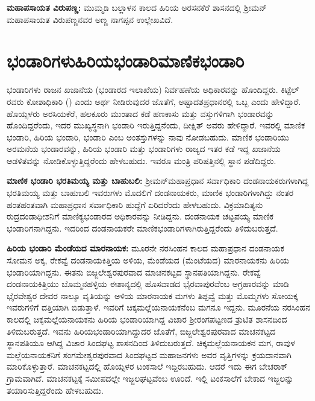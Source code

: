 \textbf{ಮಹಾಪಸಾಯತ ವಿರುಪಣ್ಣ:} ಮುಮ್ಮಡಿ ಬಲ್ಲಾಳನ ಕಾಲದ ಹಿರಿಯ ಅರಸನಕೆರೆ ಶಾಸನದಲ್ಲಿ ಶ‍್ರೀಮನ್​ ಮಹಾಪಸಾಯತ ವಿರುಪಣ್ಣನವರ ಅಣ್ಣ ನಾಗಪ್ಪನ ಉಲ್ಲೇಖವಿದೆ.


\section{ಭಂಡಾರಿಗಳು\enginline{-}ಹಿರಿಯಭಂಡಾರಿ\enginline{-}ಮಾಣಿಕಭಂಡಾರಿ}

ಭಂಡಾರಿಗಳು ರಾಜನ ಖಜಾನೆಯ (ಭಂಡಾರದ ಇಲಾಖೆಯ) ನಿರ್ವಹಣೆಯ ಅಧಿಕಾರವನ್ನು ಹೊಂದಿದ್ದರು. ಕಿಟ್ಟೆಲ್​ರವರು ಕೋಶಾಧಿಕಾರಿ () ಎಂದು ಅರ್ಥ ನೀಡಿರುವುದರ ಜೊತೆಗೆ, ಅಷ್ಟಾದಶಪ್ರಧಾನರಲ್ಲಿ ಒಬ್ಬ ಎಂದು ಹೇಳಿದ್ದಾರೆ. ಹೊಯ್ಸಳರು ಅರಸಿಯಕೆರೆ, ಹಲಕೂರು ಮುಂತಾದ ಕಡೆ ಹಣಕಾಸು ಮತ್ತು ವಸ್ತುಗಳಿಗಾಗಿ ಭಂಡಾರವನ್ನು ಹೊಂದಿದ್ದರೆಂದು, ಇದರ ಮುಖ್ಯಸ್ಥನಾಗಿ ಭಂಡಾರಿ ಇರುತ್ತಿದ್ದನೆಂದು, ದೀಕ್ಷಿತ್​ ಅವರು ಹೇಳಿದ್ದಾರೆ. ಇವರಲ್ಲಿ ಮಾಣಿಕ ಭಂಡಾರಿ, ಹಿರಿಯ ಭಂಡಾರಿ, ಭಂಡಾರಿ ಎಂಬ ಅಂತಸ್ತುಗಳನ್ನು ನಾವು ನೋಡಬಹುದು. ಮಾಣಿಕ ಭಂಡಾರಿಯು ಅರಮನೆಯ ಭಂಡಾರವನ್ನು, ಹಿರಿಯ ಭಂಡಾರಿ ಮತ್ತು ಭಂಡಾರಿಗಳು ರಾಜ್ಯದ ಇತರ ಕಡೆ ಇದ್ದ ಖಜಾನೆಯ ಆಡಳಿತವನ್ನು ನೋಡಿಕೊಳ್ಳುತ್ತಿದ್ದರೆಂದು ಹೇಳಬಹುದು. ಇವರೂ ಮಂತ್ರಿ ಪರಿಷತ್ತಿನಲ್ಲಿ ಸ್ಥಾನ ಪಡೆದಿದ್ದರು.

\textbf{ಮಾಣಿಕ ಭಂಡಾರಿ ಭರತಿಮಯ್ಯ ಮತ್ತು ಬಾಹುಬಲಿ:} ಶ‍್ರೀಮನ್​ಮಹಾಪ್ರಧಾನ ಸರ್ವಾಧಿಕಾರಿ ದಂಡನಾಯಕರು\-ಗಳಾಗಿದ್ದ ಭರತಿಮಯ್ಯ ಮತ್ತು ಬಾಹುಬಲಿ ಇವರುಗಳು ಮೊದಲಿಗೆ ದಂಡನಾಯಕರು, ಮಾಣಿಕ ಭಂಡಾರಿಗಳಾಗಿದ್ದು ನಂತರ ಹಂತಹಂತವಾಗಿ ಮಹಾಪ್ರಧಾನ ಸರ್ವಾಧಿಕಾರಿ ಹುದ್ದೆಗೆ ಏರಿದರೆಂದು ಹೇಳಬಹುದು. ವಿಕ್ರಮಾದಿತ್ಯನು ರುದ್ರದಂಡಾಧೀಶ\-ನಿಗೆ ಮಾಣಿಕ್ಯಭಂಡಾರದ ಅಧಿಕಾರವನ್ನು ನೀಡಿದ್ದನು. ದಂಡನಾಯಕ ಚಟ್ಟಪಯ್ಯ ಮಾಣಿಕ ಭಂಡಾರಿಗನಾಗಿದ್ದನು. ಇದರಿಂದ ದಂಡನಾಯಕರೇ ಮಾಣಿಕಭಂಡಾರಿಗಳಾಗಿರುತ್ತಿದ್ದರೆಂದು ತಿಳಿದುಬರುತ್ತದೆ.

\textbf{ಹಿರಿಯ ಭಂಡಾರಿ ಮೆಂಡೆಯದ ಮಾರನಾಯಕ:} ಮೂರನೇ ನರಸಿಂಹನ ಕಾಲದ ಮಹಾಪ್ರಧಾನ ದಂಡನಾಯಕ ಸೋಮನ ಅಕ್ಕ, ರೇಕವ್ವೆ ದಂಡನಾಯಕಿತ್ತಿಯ ಅಳಿಯ, ಮೆಂಡೆಯದ (ಮೆಂಟೆಯದ) ಮಾರನಾಯಕನು ಹಿರಿಯ ಭಂಡಾರಿ\-ಯಾಗಿದ್ದನು. ಈತನು ಬಿಜ್ಜಲೇಶ್ವರಪುರವಾದ ಮಾಚನಕಟ್ಟದ ಸ್ಥಾನಪತಿಯಾಗಿದ್ದನು. ರೇಕವ್ವೆ ದಂಡನಾಯಕಿತ್ತಿಯು ಬೊಮ್ಮನಹಳ್ಳಿಯ ಈಶಾನ್ಯದಲ್ಲಿ ಹೊಸವಾಡದ ಭೈರವಾಪುರವೆಂಬ ಅಗ್ರಹಾರವನ್ನು ಮಾಡಿ ಭೈರವೇಶ್ವರ ದೇವರ ನಾಲ್ಕೂ ವೃತಿಯನ್ನು ಅಳಿಯ ಮಾರನಾಯಕ ಮಗಳು ತಿಪ್ಪವ್ವೆ ಮತ್ತು ಮೊಮ್ಮಗಳು ಸೋಯಕ್ಕ ಇವರುಗಳಿಗೆ ದತ್ತಿಯಾಗಿ ಬಿಡುತ್ತಾಳೆ. ಇವರಿಗೆ ಚಿಕ್ಕಮಲ್ಲೆಯನಾಯಕನೆಂಬ ಮಗನೂ ಇದ್ದನು. ಮೂರನೆಯ ನರಸಿಂಹನ ಕಾಲದಲ್ಲಿ ಚಿಕ್ಕಮಲ್ಲೆಯನಾಯಕನು ಹಿರಿಯ ಭಂಡಾರಿಯಾಗಿದ್ದ ವಿಚಾರ ಶ‍್ರೀರಂಗಪಟ್ಟಣದ ತ್ರುಟಿತ ಶಾಸನದಿಂದ ತಿಳಿದುಬರುತ್ತದೆ. ಇವನು ಹಿರಿಯಭಂಡಾರಿಯಾಗಿ\-ದ್ದುದರ ಜೊತೆಗೆ, ಬಿಜ್ಜಲೇಶ್ವರಪುರವಾದ ಮಾಚನಕಟ್ಟದ ಸ್ಥಾನಪತಿಯೂ ಆಗಿದ್ದ ವಿಚಾರ ಸಿಂದಘಟ್ಟ ಶಾಸನದಿಂದ ತಿಳಿದು\-ಬರುತ್ತದೆ. ಚಿಕ್ಕಮಲ್ಲೆಯನಾಯಕನ ಮಗ, ರಾವುಳ ಮಲ್ಲೆಯನಾಯಕನಿಗೆ ಸಂಗಮೇಶ್ವರಪುರವಾದ ಸಿಂದಘಟ್ಟದ ಮಹಾಜನಗಳು ಅವರ ವೃತ್ತಿಗಳನ್ನು ಕ್ರಯದಾನವಾಗಿ ಮಾರಿಕೊಳ್ಳುತ್ತಾರೆ. ಮಾಚನಕಟ್ಟದಲ್ಲಿ ಹೊಯ್ಸಳರ ಟಂಕಸಾಲೆ ಇದ್ದಿರಬಹುದು. ಆದರೆ ಇದು ಈಗ ಬೇಚರಾಕ್​ ಗ್ರಾಮವಾಗಿದೆ. ಮಾಚನಕಟ್ಟಕ್ಕೆ ಸಮೀಪದಲ್ಲೇ ಇಜ್ಜಲಘಟ್ಟವೆಂಬ ಊರಿದೆ. ಇಲ್ಲಿ ಟಂಕಸಾಲೆಗೆ ಬೇಕಾದ ಇಜ್ಜಲನ್ನು ತಯಾರಿಸುತ್ತಿದ್ದರೆಂದು ಹೇಳಬಹುದು.

